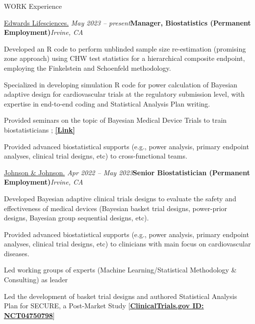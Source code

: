 \documentclass[
	11pt, %
]{resume} %
\begin{document}
\begin{rSection}{WORK Experience}

\begin{rSubsection}{
\href{https://www.edwards.com/}{Edwards Lifesciences.}
}{\em May 2023 -- present}{\textbf{Manager, Biostatistics (Permanent Employment)}}{\em Irvine, CA}
\item Developed an R code to perform unblinded sample size re-estimation (promising zone approach) using CHW test statistics for a hierarchical composite endpoint, employing the Finkelstein and Schoenfeld methodology.
\item Specialized in developing simulation R code for power calculation of Bayesian adaptive design for cardiovascular trials at the regulatory submission level, with expertise in end-to-end coding and Statistical Analysis Plan writing.
\item Provided seminars on the topic of Bayesian Medical Device Trials to train biostatisticians ; \href{https://drive.google.com/file/d/1pHxwp4T9Nq2EKNrlxqzy1VxmxcZAERH-/view}{\underline{\textbf{[Link]}}}
\item Provided advanced biostatistical supports (e.g., power analysis, primary endpoint analyses, clinical trial designs, etc) to cross-functional teams.
\end{rSubsection}


\begin{rSubsection}{
\href{https://www.jnjmedtech.com/en-US}{Johnson \& Johnson.}
}{\em Apr 2022 -- May 2023}{\textbf{Senior Biostatistician (Permanent Employment)}}{\em Irvine, CA}
\item Developed Bayesian adaptive clinical trials designs to evaluate the safety and effectiveness of medical devices (Bayesian basket trial designs, power-prior designs, Bayesian group sequential designs, etc).
\item Provided advanced biostatistical supports (e.g., power analysis, primary endpoint analyses, clinical trial designs, etc) to clinicians with main focus on cardiovascular diseases.
\item Led working groups of experts (Machine Learning/Statistical Methodology \& Consulting) as leader
\item Led the development of basket trial designs and authored Statistical Analysis Plan for SECURE, a Post-Market Study [\href{https://clinicaltrials.gov/ct2/show/NCT04750798}{\underline{\textbf{ClinicalTrials.gov ID: NCT04750798}}}]
\end{rSubsection}



\end{rSection}
\end{document}
